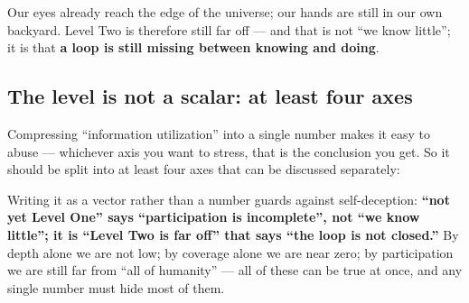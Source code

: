 \documentclass[11pt,fontset=none]{ctexart}
\begin{document}
Our eyes already reach the edge of the universe; our hands are still in our own backyard. Level Two is therefore still far off --- and that is not ``we know little''; it is that \textbf{a loop is still missing between knowing and doing}.

\subsection{The level is not a scalar: at least four axes}

Compressing ``information utilization'' into a single number makes it easy to abuse — whichever axis you want to stress, that is the conclusion you get. So it should be split into at least four axes that can be discussed separately:


Writing it as a vector rather than a number guards against self-deception: \textbf{``not yet Level One'' says ``participation is incomplete'', not ``we know little''; it is ``Level Two is far off'' that says ``the loop is not closed.''} By depth alone we are not low; by coverage alone we are near zero; by participation we are still far from ``all of humanity'' — all of these can be true at once, and any single number must hide most of them.
\end{document}
